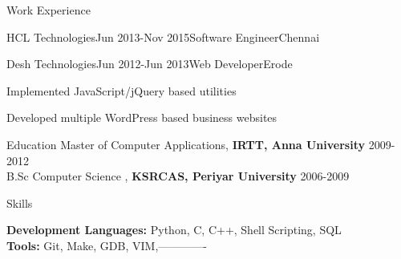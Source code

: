 \documentclass{resume} %
\begin{document}
\begin{rSection}{ Work Experience }
\begin{rSubsection}{HCL Technologies}{Jun 2013-Nov 2015}{Software Engineer}{Chennai}
\end{rSubsection} 

\vspace{-4pt}


\begin{rSubsection}{Desh Technologies}{Jun 2012-Jun 2013}{Web Developer}{Erode}    

\vspace{-3pt}

\item Implemented JavaScript/jQuery based utilities 
\item Developed multiple WordPress based business websites

\end{rSubsection} 

 
\end{rSection}


\begin{rSection}{Education}
{ Master of Computer Applications, \textbf{IRTT, Anna University}} \hfill {2009-2012}
\\
{ B.Sc Computer Science , \textbf{KSRCAS, Periyar University}} \hfill {2006-2009}

  


\end{rSection} 


\begin{rSection}{Skills} \itemsep -3pt  

{\textbf{Development Languages:} Python, C, C++, Shell Scripting, SQL }  \\
{\textbf{Tools:} Git, Make, GDB, VIM,------------- } 
\end{rSection}  
 







\end{document}
